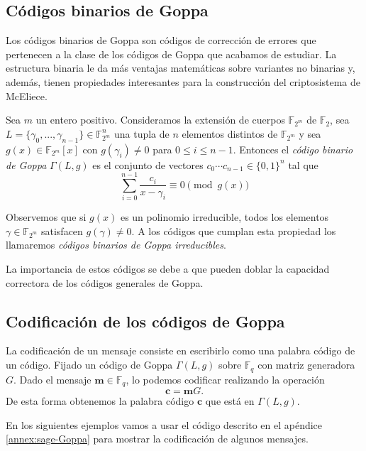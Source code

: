 \subsection{Códigos binarios de Goppa}

Los códigos binarios de Goppa son códigos de corrección de errores que pertenecen a la clase de los códigos de Goppa que acabamos de estudiar. La estructura binaria le da más ventajas matemáticas sobre variantes no binarias y, además, tienen propiedades interesantes para la construcción del criptosistema de McEliece.

\begin{definition}
    Sea $m$ un entero positivo. Consideramos la extensión de cuerpos $\mathbb{F}_{2^m}$ de $\mathbb{F}_2$, sea $L = \{ \gamma_0, ..., \gamma_{n-1} \} \in \mathbb{F}_{2^m}^n$ una tupla de $n$ elementos distintos de $\mathbb{F}_{2^m}$ y sea $g(x) \in \mathbb{F}_{2^m}[x]$ con $g(\gamma_i) \neq 0$ para $0 \leq i \leq n - 1$. Entonces el \emph{código binario de Goppa} $\Gamma(L,g)$ es el conjunto de vectores $c_0 \cdots c_{n-1} \in \{ 0, 1 \}^n$ tal que 
    \begin{equation}
        \sum_{i=0}^{n-1} \frac{c_i}{x - \gamma_i} \equiv 0 \pmod{g(x)}
    \end{equation}
\end{definition}

Observemos que si $g(x)$ es un polinomio irreducible, todos los elementos $\gamma \in \mathbb{F}_{2^m}$ satisfacen $g(\gamma) \neq 0$. A los códigos que cumplan esta propiedad los llamaremos \emph{códigos binarios de Goppa irreducibles}.

La importancia de estos códigos se debe a que pueden doblar la capacidad correctora de los códigos generales de Goppa.

\subsection{Codificación de los códigos de Goppa}

La codificación de un mensaje consiste en escribirlo como una palabra código de un código. Fijado un código de Goppa $\Gamma (L, g)$ sobre $\mathbb{F}_q$ con matriz generadora $G$. Dado el mensaje $\textbf{m} \in \mathbb{F}_q$, lo podemos codificar realizando la operación
\[
    \textbf{c} = \textbf{m} G.  
\]
De esta forma obtenemos la palabra código $\textbf{c}$ que está en $\Gamma (L, g)$.

En los siguientes ejemplos vamos a usar el código descrito en el apéndice \ref{annex:sage-Goppa} para mostrar la codificación de algunos mensajes.

